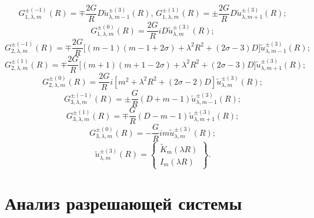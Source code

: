 \begin{equation}
G_{1,\lambda ,m}^{ \pm ( - 1)}(R) =  \mp \frac{{2G}}{R}D\tilde u_{\lambda ,m - 1}^{ \pm (3)}(R),\, G_{1,\lambda ,m}^{ \pm (1)}(R) =  \pm \frac{{2G}}{R}D\tilde u_{\lambda ,m + 1}^{ \pm (3)}(R);
\label{eq:7:35}
\end{equation}
\begin{equation}
G_{1,\lambda ,m}^{ \pm (0)}(R) = \frac{{2G}}{R}iD\tilde u_{\lambda ,m}^{ \pm (3)}(R);
\label{eq:7:36}
\end{equation}
\begin{equation}
G_{2,\lambda ,m}^{ \pm ( - 1)}(R) = \mp \frac{{2G}}{R}\bigg[(m - 1)(m - 1 + 2\sigma ) + {\lambda ^2}{R^2} + (2\sigma  - 3)D\bigg]\tilde u_{\lambda ,m - 1}^{ \pm (3)}(R);
\label{eq:7:37}
\end{equation}
\begin{equation}
G_{2,\lambda ,m}^{ \pm (1)}(R) = \mp \frac{{2G}}{R}\bigg[ (m + 1)(m + 1 - 2\sigma ) + {\lambda ^2}{R^2} + (2\sigma  - 3)D \bigg]\tilde u_{\lambda ,m + 1}^{ \pm (3)}(R);
\label{eq:7:38}
\end{equation}
\begin{equation}
G_{2,\lambda ,m}^{ \pm (0)}(R) = \frac{{2G}}{R}i\left[ {{m^2} + {\lambda ^2}{R^2} + (2\sigma  - 2)D} \right]\tilde u_{\lambda ,m}^{ \pm (3)}(R);
\label{eq:7:39}
\end{equation}
\begin{equation}
G_{3,\lambda ,m}^{ \pm ( - 1)}(R) =  \pm \frac{G}{R}\left( {D + m - 1} \right)\tilde u_{\lambda ,m - 1}^{ \pm (3)}(R);
\label{eq:7:40}
\end{equation}
\begin{equation}
G_{3,\lambda ,m}^{ \pm (1)}(R) =  \mp \frac{G}{R}\left( {D - m - 1} \right)\tilde u_{\lambda ,m + 1}^{ \pm (3)}(R);
\label{eq:7:41}
\end{equation}
\begin{equation}
G_{3,\lambda ,m}^{ \pm (0)}(R) =  - \frac{G}{R}im\tilde u_{\lambda ,m}^{ \pm (3)}(R);
\label{eq:7:41a}
\end{equation}
\begin{equation}
\tilde u_{\lambda ,m}^{ \pm (3)}(R) = \left\{ \begin{array}{l}
{{\tilde K}_m}\left( {\lambda R} \right)\\
{I_m}\left( {\lambda R} \right)
\end{array} \right\}.
\label{eq:7:42}
\end{equation}

\section{Анализ разрешающей системы}

